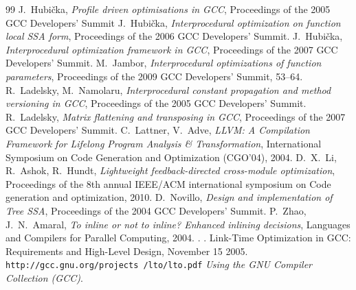 \documentclass[final]{ols}
\begin{document}
\begin{thebibliography}{99}
 J.\ Hubi\v cka, {\em Profile driven optimisations in GCC}, Proceedings of the 2005 GCC Developers' Summit
 J.\ Hubi\v cka, {\em Interprocedural optimization on function local SSA form}, Proceedings of the 2006 GCC Developers' Summit.
 J.\ Hubi\v cka, {\em Interprocedural optimization framework in GCC}, Proceedings of the 2007 GCC Developers' Summit.
 M.\ Jambor, {\em Interprocedural optimizations of function parameters}, Proceedings of the 2009 GCC Developers' Summit, 53--64.
 R.~Ladelsky, M.~Namolaru, {\em Interprocedural constant propagation and method versioning in GCC}, Proceedings of the 2005 GCC Developers' Summit.
 R.~Ladelsky, {\em Matrix flattening and transposing in GCC}, Proceedings of the 2007 GCC Developers' Summit.
 C.~Lattner, V.~Adve, {\em LLVM: A Compilation Framework for Lifelong Program Analysis \& Transformation}, International Symposium on Code Generation and Optimization (CGO'04), 2004.
 D.~X.~Li, R.~Ashok, R.~Hundt, {\em Lightweight feedback-directed cross-module optimization}, Proceedings of the 8th annual IEEE/ACM international symposium on Code generation and optimization, 2010.
 D.~Novillo, {\em Design and implementation of Tree SSA}, Proceedings of the 2004 GCC Developers' Summit.
 P.~Zhao, J.~N.~Amaral, {\em To inline or not to inline? Enhanced inlining decisions}, Languages and Compilers for Parallel Computing, 2004.
 .
 .
 Link-Time Optimization in GCC: Requirements and High-Level Design, November 15 2005. {\tt http://gcc.gnu.org/projects /lto/lto.pdf}
 {\em Using the GNU Compiler Collection (GCC)}.


\end{thebibliography}
\end{document}
